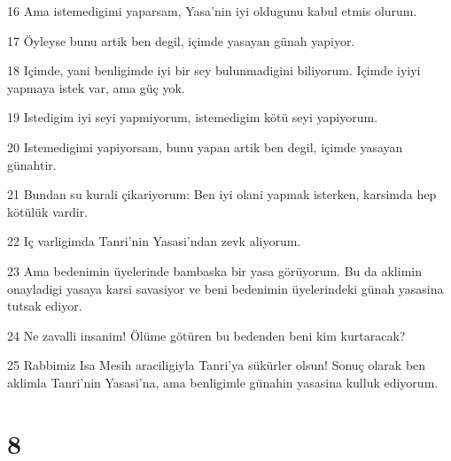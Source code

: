 \par 16 Ama istemedigimi yaparsam, Yasa'nin iyi oldugunu kabul etmis olurum.
\par 17 Öyleyse bunu artik ben degil, içimde yasayan günah yapiyor.
\par 18 Içimde, yani benligimde iyi bir sey bulunmadigini biliyorum. Içimde iyiyi yapmaya istek var, ama güç yok.
\par 19 Istedigim iyi seyi yapmiyorum, istemedigim kötü seyi yapiyorum.
\par 20 Istemedigimi yapiyorsam, bunu yapan artik ben degil, içimde yasayan günahtir.
\par 21 Bundan su kurali çikariyorum: Ben iyi olani yapmak isterken, karsimda hep kötülük vardir.
\par 22 Iç varligimda Tanri'nin Yasasi'ndan zevk aliyorum.
\par 23 Ama bedenimin üyelerinde bambaska bir yasa görüyorum. Bu da aklimin onayladigi yasaya karsi savasiyor ve beni bedenimin üyelerindeki günah yasasina tutsak ediyor.
\par 24 Ne zavalli insanim! Ölüme götüren bu bedenden beni kim kurtaracak?
\par 25 Rabbimiz Isa Mesih araciligiyla Tanri'ya sükürler olsun! Sonuç olarak ben aklimla Tanri'nin Yasasi'na, ama benligimle günahin yasasina kulluk ediyorum.

\chapter{8}

